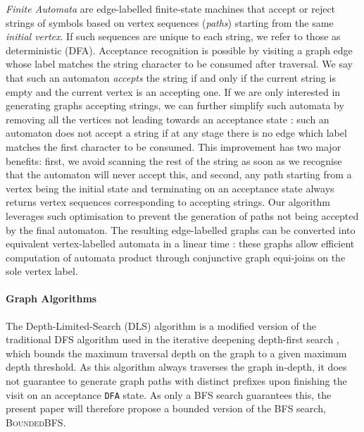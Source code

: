 \documentclass[acmengage]{acmart}
\begin{document}
\textit{Finite Automata} are edge-labelled finite-state machines that accept or reject strings of symbols based on vertex sequences (\textit{paths}) starting from the same \textit{initial vertex}. If such sequences are unique to each string, we refer to those as deterministic (DFA). Acceptance recognition is possible by visiting a graph edge whose label matches the string character to be consumed after traversal. We say that such an automaton \textit{accepts} the string if and only if the current string is empty and the current vertex is an accepting one. If we are only interested in generating graphs accepting strings, we can further simplify such automata by removing all the vertices not leading towards an acceptance state \cite{DBLP:conf/caise/CiccioBCM15}: such an automaton does not accept a string if at any stage there is no edge which label matches the first character to be consumed. This improvement has two major benefits: first, we avoid scanning the rest of the string as soon as we recognise that the automaton will never accept this, and second, any path starting from a vertex being the initial state and terminating on an acceptance state always returns vertex sequences corresponding to accepting strings. Our algorithm leverages such optimisation to prevent the generation of paths not being accepted by the final automaton. The resulting edge-labelled graphs can be converted into equivalent vertex-labelled automata in a linear time \cite{DBLP:conf/icpm/BergamiMMP21}: these  graphs allow  efficient computation of automata product through conjunctive graph equi-joins on the sole vertex label.


\paragraph*{Graph Algorithms}%

The Depth-Limited-Search (DLS) algorithm is a modified version of the traditional DFS algorithm used in the iterative deepening depth-first search \cite{DBLP:journals/ai/Korf85}, which  bounds the maximum traversal depth on the graph to a given maximum depth threshold. As this algorithm always traverses the graph in-depth, it does not guarantee to generate graph paths with distinct prefixes upon finishing the visit on an acceptance \texttt{DFA} state. As only a BFS search guarantees this, the present paper will therefore propose a bounded version of the BFS search, \textsc{BoundedBFS}.
\end{document}
